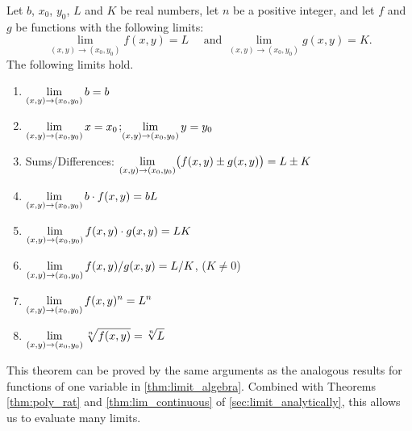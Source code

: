 \begin{theorem}\label{thm:multi_limit_algebra}%
Let $b$, $x_0$, $y_0$, $L$ and $K$ be real numbers,  let $n$ be a positive integer, and let $f$ and $g$ be functions with the following limits:
\[\lim_{(x,y)\to (x_0,y_0)}f(x,y) = L \quad \text{\ and\ } \lim_{(x,y)\to (x_0,y_0)} g(x,y) = K.\]
The following limits hold.
\begin{enumerate}
\settowidth{\widest}{Sums/Differences:}
\item {} $\displaystyle\lim_{(x,y)\to (x_0,y_0)} b = b$
\item {} $\displaystyle\lim_{(x,y)\to (x_0,y_0)} x = x_0$;\qquad $\displaystyle\lim_{(x,y)\to (x_0,y_0)} y = y_0$
\item Sums/Differences: $\displaystyle\lim_{(x,y)\to (x_0,y_0)}\bigl(f(x,y)\pm g(x,y)\bigr) = L\pm K$
\item {} $\displaystyle\lim_{(x,y)\to (x_0,y_0)} b\cdot f(x,y) = bL$
\item {} $\displaystyle\lim_{(x,y)\to (x_0,y_0)} f(x,y)\cdot g(x,y) = LK$
\item {} $\displaystyle\lim_{(x,y)\to (x_0,y_0)} f(x,y)/g(x,y) = L/K$, ($K\neq 0$)
\item {} $\displaystyle\lim_{(x,y)\to (x_0,y_0)} f(x,y)^n = L^n$
\item {} $\displaystyle\lim_{(x,y)\to (x_0,y_0)} \sqrt[n]{f(x,y)} = \sqrt[n]{L}$\\
\makebox[\widest]{}
\end{enumerate}
\end{theorem}

This theorem can be proved by the same arguments as the analogous results for functions of one variable in \autoref{thm:limit_algebra}.  Combined with Theorems \ref{thm:poly_rat} and \ref{thm:lim_continuous} of \autoref{sec:limit_analytically}, this allows us to evaluate many limits.

